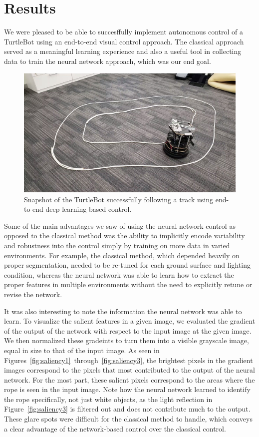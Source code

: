 \section{Results}
\label{sec:results}

We were pleased to be able to succesffully implement autonomous control of a
TurtleBot using an end-to-end visual control approach. The classical approach served as a meaningful learning experience and also a useful tool in collecting data to train the neural network approach, which was our end goal.

\begin{figure}[hbt]
  \includegraphics[width=\columnwidth]{figures/success_track}
  \caption{Snapshot of the TurtleBot successfully following a track using end-to-end deep learning-based control.}
  \label{fig:success_track}
\end{figure}

Some of the main advantages we saw of using the neural network control as opposed to the classical method was the ability to implicitly encode variability and robustness into the control simply by training on more data in varied environments. For example, the classical method, which depended heavily on proper segmentation, needed to be re-tuned for each ground surface and lighting condition, whereas the neural network was able to learn how to extract the proper features in multiple environments without the need to explicitly retune or revise the network.

It was also interesting to note the information the neural network was able to
learn. To visualize the salient features in a given image, we evaluated the
gradient of the output of the network with respect to the input image at the
given image. We then normalized these gradeints to turn them into a visible
grayscale image, equal in size to that of the input image. As seen in
Figures~\ref{fig:saliency1}~through~\ref{fig:saliency3}, the brightest pixels in
the gradient images correspond to the pixels that most contributed to the output
of the neural network. For the most part, these salient pixels correspond to the areas where the rope is seen in the input image. Note how the neural network learned to identify the rope specifically, not just white objects, as the light reflection in Figure~\ref{fig:saliency3} is filtered out and does not contribute much to the output. These glare spots were difficult for the classical method to handle, which conveys a clear advantage of the network-based control over the classical control.

